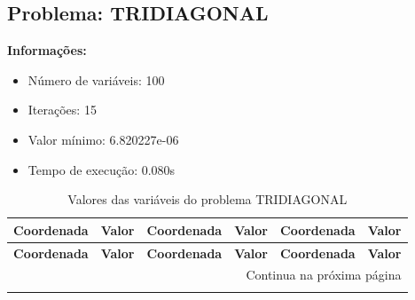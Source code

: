 \documentclass[12pt]{article}
\begin{document}
\newpage            
\subsection{Problema: TRIDIAGONAL}

\textbf{Informações:}
\begin{itemize}
\item Número de variáveis: 100
\item Iterações: 15
\item Valor mínimo: 6.820227e-06
\item Tempo de execução: 0.080s
\end{itemize}

\small
\begin{longtable}{@{}cc|cc|cc@{}}
\caption{Valores das variáveis do problema TRIDIAGONAL} \\
\toprule
\textbf{Coordenada} & \textbf{Valor} & \textbf{Coordenada} & \textbf{Valor} & \textbf{Coordenada} & \textbf{Valor} \\
\midrule
\endfirsthead

\toprule
\textbf{Coordenada} & \textbf{Valor} & \textbf{Coordenada} & \textbf{Valor} & \textbf{Coordenada} & \textbf{Valor} \\
\midrule
\endhead

\midrule \multicolumn{6}{r}{{Continua na próxima página}} \\ \midrule
\endfoot


\end{longtable}
\end{document}
